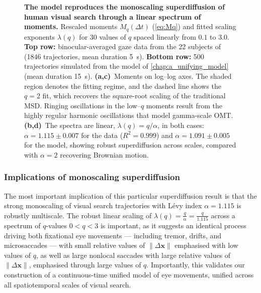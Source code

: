 \begin{figure}[htbp!]
	\centering
	\begin{subfigure}[t]{0.49\textwidth}
		\centering
		\label{subfig:fad_data}
	\end{subfigure}
	\hfill
	\begin{subfigure}[t]{0.49\textwidth}
		\centering
		\label{subfig:scaling_order_data}
	\end{subfigure}
	\vfill
	\begin{subfigure}[t]{0.49\textwidth}
		\centering
		\label{subfig:fad_model}
	\end{subfigure}
	\hfill
	\begin{subfigure}[t]{0.49\textwidth}
		\centering
		\label{subfig:scaling_order_model}
	\end{subfigure}
    \caption{\textbf{The model reproduces the monoscaling superdiffusion of human visual search through a linear spectrum of moments.} Rescaled moments $M_q(\Delta t)$ (\cref{eq:Mq}) and fitted scaling exponents $\lambda(q)$ for 30 values of $q$ spaced linearly from $0.1$ to $3.0$. \textbf{Top row:} binocular-averaged gaze data from the 22 subjects of \textcite{naher_primate_saccades} (1846 trajectories, mean duration \qty{5}{\s}). \textbf{Bottom row:} 500 trajectories simulated from the model of \cref{chap:a_unifying_model} (mean duration \qty{15}{\s}). \textbf{(a,c)}~Moments on log--log axes. The shaded region denotes the fitting regime, and the dashed line shows the $q=2$ fit, which recovers the square-root scaling of the traditional MSD. Ringing oscillations in the low--$q$ moments result from the highly regular harmonic oscillations that model gamma-scale OMT. \textbf{(b,d)}~The spectra are linear, $\lambda(q) = q/\alpha$, in both cases: $\alpha = 1.115 \pm 0.007$ for the data ($R^2 = 0.999$) and $\alpha = 1.091 \pm 0.005$ for the model, showing robust superdiffusion across scales, compared with $\alpha = 2$ recovering Brownian motion.}
    \label{fig:search_superdiffusion}
\end{figure}
\subsubsection*{Implications of monoscaling superdiffusion}
The most important implication of this particular superdiffusion result is that the strong monoscaling of visual search trajectories with Lévy index $\alpha = 1.115$ is robustly multiscale. The robust linear scaling of $\lambda(q)=\frac{q}{\alpha}=\frac{q}{1.115}$ across a spectrum of $q$-values $0 < q < 3$ is important, as it suggests an identical process driving both fixational eye movements --- including tremor, drifts, and microsaccades --- with small relative values of $\| \Delta \textbf{x}\|$ emphasised with low values of $q$, as well as large nonlocal saccades with large relative values of $\| \Delta \textbf{x} \|$, emphasised through large values of $q$. Importantly, this validates our construction of a continuous-time unified model of eye movements, unified across all spatiotemporal scales of visual search.
